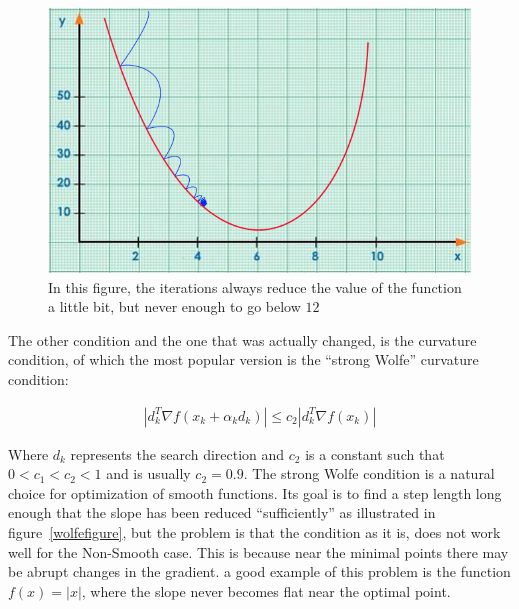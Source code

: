 \begin{figure} 
\begin{center}
\includegraphics[scale=0.5]{Figures/armijo.png}
\caption[Representation of the Armijo Condition in a Nutshell]{In this figure, the iterations always reduce the value of the function a little bit, but never enough to go below $12$}
\label{armijograph}
\end{center}
\end{figure}

The other condition and the one that was actually changed, is the curvature condition, of which the most popular version is the ``strong Wolfe'' curvature condition:

\begin{equation} \label{strogwolfeq}
  \begin{aligned}
    |d_k^T \nabla f(x_k + \alpha _k d_k)| \leq c_2 |d_k^T \nabla f(x_k)|
  \end{aligned}
\end{equation}

Where $d_k$ represents the search direction and $c_2$ is a constant such that $0 < c_1 < c_2 < 1$ and is usually $c_2 = 0.9$\citep{nocedal}. The strong Wolfe condition is a natural choice for optimization of smooth functions. Its goal is to find a step length long enough that the slope has been reduced ``sufficiently'' as illustrated in figure~\ref{wolfefigure}, but the problem is that the condition as it is, does not work well for the Non-Smooth case. This is because near the minimal points there may be abrupt changes in the gradient. a good example of this problem is the function $f(x) = |x|$, where the slope never becomes flat near the optimal point.

